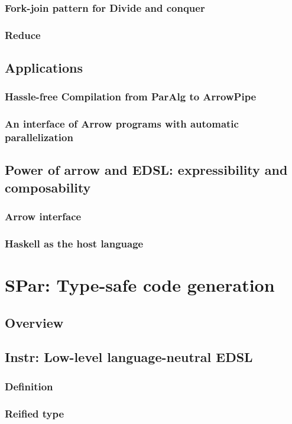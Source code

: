 \documentclass[a4paper, twoside]{report}
\begin{document}
\subsection{Fork-join pattern for Divide and conquer}
\subsection{Reduce}
\section{Applications}
\subsection{Hassle-free Compilation from ParAlg to ArrowPipe} %
\subsection{An interface of Arrow programs with automatic parallelization}
\section{Power of arrow and EDSL: expressibility and composability}
\subsection{Arrow interface}
\subsection{Haskell as the host language}

\chapter{SPar: Type-safe code generation}
\section{Overview}
\section{Instr: Low-level language-neutral EDSL}
\subsection{Definition}
\subsection{Reified type}
\end{document}
